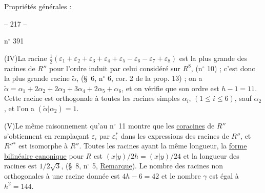 Propriétés générales :



\begin{center}-- 217 --\end{center}
\hfill n$^{\circ}$ 391

(IV)\quad La racine $\frac12(\varepsilon_1+\varepsilon_2+\varepsilon_3+\varepsilon_4+\varepsilon_5-\varepsilon_6-\varepsilon_7+\varepsilon_8)$ est la plus grande
des racines de $R''$ pour l'ordre induit par celui considéré sur $R^8$, (n$^{\circ}$ 10) ;
c'est donc la plus grande racine $\tilde\alpha$, (\S\ 6, n$^{\circ}$ 6, cor. 2 de la prop. 13) ; on a
$\tilde\alpha=\alpha_1+2\alpha_2+2\alpha_3+3\alpha_4+2\alpha_5+\alpha_6$, et on vérifie que son ordre est $h-1=11$.
Cette racine est orthogonale à toutes les racines simples $\alpha_i$, $(1\leq i\leq6)$, sauf
$\alpha_2$, et l'on a $(\tilde\alpha|\alpha_2)=1$.

(V)\quad Le même raisonnement qu'au n$^{\circ}$ 11 montre que les \uline{coracines} de $R''$ s'obtiennent
en remplaçant $\varepsilon_i$ par $\varepsilon_i^*$ dans les expressions des racines de $R''$, et $R''{}^*$ est
isomorphe à $R''$. Toutes les racines ayant la même longueur, la \uline{forme bilinéaire
canonique} pour $R$ est $(x|y)/2h=(x|y)/24$ et la longueur des racines est $1/2\sqrt3$,
(\S\ 8, n$^{\circ}$ 5, \uline{Remarque}). Le nombre des racines non orthogonales à une racine
donnée est $4h-6=42$ et le nombre $\gamma$ est égal à $h^2=144$.

